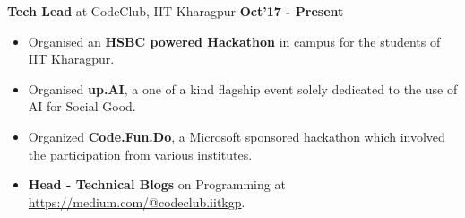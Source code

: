 \documentclass[10pt]{article}
\begin{document}
\vspace{-1.3ex}
\spacedhrule{0.1ex}{2.0ex}
\large { \textbf{Tech Lead} at CodeClub, IIT Kharagpur} \normalsize
\href{https://github.com/shmundhra/Credentials/tree/master/Positions\%20of\%20Responsibility} {\hspace{0.5ex}\faMousePointer}
{\hfill} \textbf{Oct'17 - Present}\\[-1.8em]
\begin{itemize}
    \item Organised an \textbf{HSBC powered Hackathon} in campus for the students of IIT Kharagpur.\\[-2em]
    \item Organised \textbf{up.AI}, a one of a kind flagship event solely dedicated to the use of AI for Social Good.\\[-2em]
    \item Organized \textbf{Code.Fun.Do}, a Microsoft sponsored hackathon which involved the participation from various institutes.\\[-2em]
    \item \textbf{Head - Technical Blogs} on Programming at 
    \href{https://medium.com/@codeclub.iitkgp}    {https://medium.com/@codeclub.iitkgp}.
\end{itemize}
\iffalse
\end{document}
